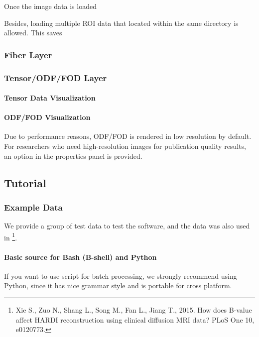 \documentclass[letterpaper,10pt,english]{sphinxmanual}
\begin{document}
Once the image data is loaded

Besides, loading multiple ROI data that located within the same directory is allowed.
This saves


\subsubsection{Fiber Layer}
\label{visualization:fiber-layer}

\subsubsection{Tensor/ODF/FOD Layer}
\label{visualization:tensor-odf-fod-layer}

\paragraph{Tensor Data Visualization}
\label{visualization:tensor-data-visualization}

\paragraph{ODF/FOD Visualization}
\label{visualization:odf-fod-visualization}
Due to performance reasons, ODF/FOD is rendered in low resolution by default.
For researchers who need high-resolution images for publication quality results, an option in
the properties panel is provided.


\subsection{Tutorial}
\label{tutorial::doc}\label{tutorial:tutorial}

\subsubsection{Example Data}
\label{exampledata::doc}\label{exampledata:example-data}
We provide a group of test data to test the software, and the data was also used in \footnote{
Xie S., Zuo N., Shang L., Song M., Fan L., Jiang T., 2015. How does B-value affect HARDI reconstruction using clinical diffusion MRI data? PLoS One 10, e0120773.
}.


\paragraph{Basic source for Bash (B-shell) and Python}
\label{exampledata:basic-source-for-bash-b-shell-and-python}
If you want to use script for batch processing, we strongly recommend using Python, since it has nice grammar style and is portable for cross platform.
\end{document}
